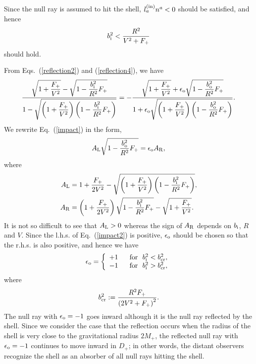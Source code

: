 \documentclass[aps,preprint,preprintnumber,nofootinbib,amsmath,amssymb,ascmac,bm,12pt]{revtex4}
\newcommand{\omi}{\omega_{\rm i}}
\newcommand{\omo}{\omega_{\rm o}}
\newcommand{\bi}{b_{\rm i}}
\newcommand{\bo}{b_{\rm o}}
\begin{document}
Since the null ray is assumed to hit the shell, $l_a^{\rm (in)}n^a<0$ should be satisfied, and hence  
\begin{equation}
\bi^2<\frac{R^2}{V^2+F_+} \label{hitting}
\end{equation}
should hold. 



From Eqs.~(\ref{reflection2}) and (\ref{reflection4}), we have
\begin{equation}
\frac{\sqrt{1+\dfrac{F_+}{V^2}}-\sqrt{1-\dfrac{\bi^2}{R^2}F_+}}
{1-\sqrt{\left(1+\dfrac{F_+}{V^2}\right)\left(1-\dfrac{\bi^2}{R^2}F_+\right)}}
=-\frac{\sqrt{1+\dfrac{F_+}{V^2}}+\epsilon_{\rm o}\sqrt{1-\dfrac{\bo^2}{R^2}F_+}}
{1+\epsilon_{\rm o}\sqrt{\left(1+\dfrac{F_+}{V^2}\right)\left(1-\dfrac{\bo^2}{R^2}F_+\right)}}.
\label{impact}
\end{equation}
We rewrite Eq.~(\ref{impact}) in the form, 
\begin{align}
A_{\rm L}\sqrt{1-\dfrac{\bo^2}{R^2}F_+}=\epsilon_{\rm o}A_{\rm R}, \label{impact2}
\end{align}
where
\begin{align}
A_{\rm L}&=1+\frac{F_+}{2V^2}-\sqrt{\left(1+\dfrac{F_+}{V^2}\right)\left(1-\dfrac{\bi^2}{R^2}F_+\right)}, \\
A_{\rm R}&=\left(1+\frac{F_+}{2V^2}\right)\sqrt{1-\dfrac{\bi^2}{R^2}F_+}-\sqrt{1+\dfrac{F_+}{V^2}}.
\end{align}
It is not so difficult to see that $A_{\rm L}>0$ whereas the sign of $A_{\rm R}$ depends on 
$\bi$, $R$ and $V$. Since the l.h.s. of Eq.~(\ref{impact2}) is positive, $\epsilon_{\rm o}$ should be 
chosen so that the r.h.s. is also positive, and hence we have 
\begin{equation}
\epsilon_{\rm o}=
\left\{
\begin{array}{ll}
+1&~~{\rm for}~~\bi^2<b_{\rm cr}^2,  \\
-1&~~{\rm for}~~\bi^2>b_{\rm cr}^2, \\
\end{array}\right.
\label{epsilon-o}
\end{equation}
where
$$
b_{\rm cr}^2:=\dfrac{R^2F_+}{\left(2V^2+F_+\right)^2}.
$$
The null ray with $\epsilon_{\rm o}=-1$ goes inward although it is the null ray reflected by the shell.  
Since we consider the case that the reflection occurs when the radius 
of the shell is very close to the gravitational radius $2M_+$, 
the reflected null ray with $\epsilon_{\rm o}=-1$ continues to move inward in $D_+$; 
in other words, the distant observers recognize the shell as an absorber of all null rays hitting the shell. 
\end{document}
